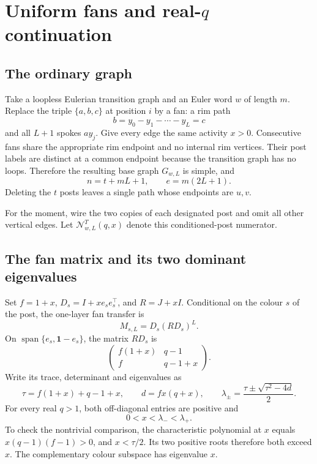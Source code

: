 \documentclass[11pt,a4paper]{article}
\theoremstyle{remark}\newtheorem{remark}[theorem]{Remark}
\newcommand{\one}{\mathbf 1}\newcommand{\N}{\mathcal N}
\begin{document}
\section{Uniform fans and real-$q$ continuation}
\subsection{The ordinary graph}
Take a loopless Eulerian transition graph and an Euler word $w$ of length $m$. Replace the triple $\{a,b,c\}$ at position $i$ by a fan: a rim path
\[
b=y_0-y_1-\cdots-y_L=c
\]
and all $L+1$ spokes $ay_j$. Give every edge the same activity $x>0$. Consecutive fans share the appropriate rim endpoint and no internal rim vertices. Their post labels are distinct at a common endpoint because the transition graph has no loops. Therefore the resulting base graph $G_{w,L}$ is simple, and
\begin{equation}\label{eq:corecounts}
n=t+mL+1,\qquad e=m(2L+1).
\end{equation}
Deleting the $t$ posts leaves a single path whose endpoints are $u,v$.

For the moment, wire the two copies of each designated post and omit all other vertical edges. Let $\N_{w,L}^{T}(q,x)$ denote this conditioned-post numerator.

\subsection{The fan matrix and its two dominant eigenvalues}
Set $f=1+x$, $D_s=I+xe_se_s^\top$, and $R=J+xI$. Conditional on the colour $s$ of the post, the one-layer fan transfer is
\begin{equation}\label{eq:fan}
M_{s,L}=D_s(RD_s)^L.
\end{equation}
On $\operatorname{span}\{e_s,\one-e_s\}$, the matrix $RD_s$ is
\[
\begin{pmatrix}f(1+x)&q-1\\ f&q-1+x\end{pmatrix}.
\]
Write its trace, determinant and eigenvalues as
\begin{equation}\label{eq:eigen}
\tau=f(1+x)+q-1+x,\qquad d=fx(q+x),\qquad
\lambda_\pm=\frac{\tau\pm\sqrt{\tau^2-4d}}2.
\end{equation}
For every real $q>1$, both off-diagonal entries are positive and
\begin{equation}\label{eq:ordering}
0<x<\lambda_-<\lambda_+.
\end{equation}
To check the nontrivial comparison, the characteristic polynomial at $x$ equals
$x(q-1)(f-1)>0$, and $x<\tau/2$. Its two positive roots therefore both exceed $x$.
The complementary colour subspace has eigenvalue $x$.
\end{document}

